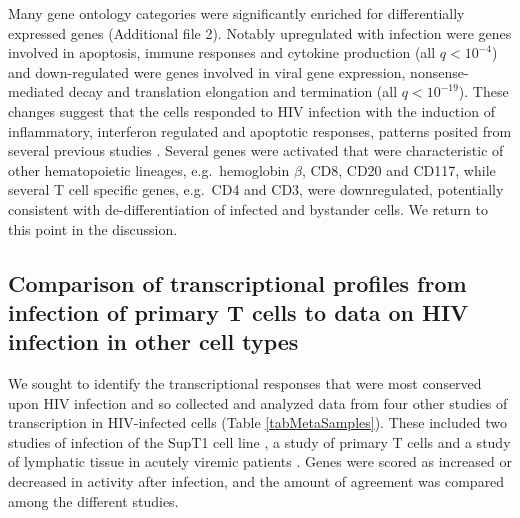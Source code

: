 \documentclass[../sherrill-Mix_thesis.tex]{subfiles}
\begin{document}
		Many gene ontology categories were significantly enriched for differentially expressed genes (Additional file 2). Notably upregulated with infection were genes involved in apoptosis, immune responses and cytokine production (all $q<10^{-4}$) and down-regulated were genes involved in viral gene expression, nonsense-mediated decay and translation elongation and termination (all $q<10^{-19}$). These changes suggest that the cells responded to HIV infection with the induction of inflammatory, interferon regulated and apoptotic responses, patterns posited from several previous studies \citep{Corbeil2001,delaFuente2002,Woelk2004,Hyrcza2007,Wu2008,Smith2010,Chang2011,Lefebvre2011,Imbeault2012,Mohammadi2013,Chang2013}. Several genes were activated that were characteristic of other hematopoietic lineages, e.g.\  hemoglobin $\beta$, CD8, CD20 and CD117, while several \cdFour{} T cell specific genes, e.g.\  CD4 and CD3, were downregulated, potentially consistent with de-differentiation of infected and bystander cells.  We return to this point in the discussion. 
	
	\subsection{Comparison of transcriptional profiles from \hivEight{} infection of prim\-ary T cells to data on HIV infection in other cell types}
		We sought to identify the transcriptional responses that were most conserved upon HIV infection and so collected and analyzed data from four other studies of transcription in HIV-infected cells (Table \ref{tabMetaSamples}). These included two studies of infection of the SupT1 cell line \citep{Lefebvre2011,Chang2011}, a study of primary \cdFour{} T cells \citep{Imbeault2012} and a study of lymphatic tissue in acutely viremic patients \citep{Li2009}. Genes were scored as increased or decreased in activity after infection, and the amount of agreement was compared among the different studies.
\end{document}
